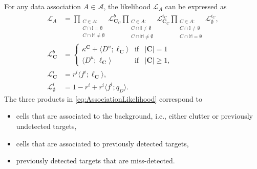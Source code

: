 \documentclass[journal]{IEEEtran}
\begin{document}
For any data association $A\in\mathcal{A}$, the likelihood $\mathcal{L}_{A}$ can be expressed as \cite{pmbmextended2}
\begin{subequations}
\begin{align}
	\mathcal{L}_{A} & = \prod_{ \substack{C\in A : \\ C\cap\mathbb{I}=\emptyset \\ C\cap\mathbb{M}\neq\emptyset}} \mathcal{L}^{b}_{\mathbf{C}_C} \prod_{ \substack{C\in A : \\ C\cap\mathbb{I}\neq \emptyset \\ C\cap\mathbb{M} \neq \emptyset }} \mathcal{L}_{\mathbf{C}_C}^{i_C } \prod_{ \substack{C\in A : \\ C \cap \mathbb{I}\neq\emptyset \\ C\cap\mathbb{M} = \emptyset }} \mathcal{L}_{\emptyset}^{i_C},  \label{eq:AssociationLikelihood}  \\
	\mathcal{L}_{\mathbf{C}}^{b} & = \left\{ \begin{array}{lcl} \kappa^{\mathbf{C}} + \langle D_{}^{u};\ell_{\mathbf{C}} \rangle & \text{if} & |\mathbf{C}|=1 \\ \langle{ D_{}^{u} };{ \ell_{\mathbf{C}} }\rangle & \text{if} & |\mathbf{C}| \geq 1, \end{array} \right. \\
	\mathcal{L}_{\mathbf{C}}^{i} & =  r_{}^{i} \langle{f_{}^{i}};{ \ell_{\mathbf{C}}}\rangle, \\
	\mathcal{L}_{\emptyset}^{i} & = 1-r_{}^{i}+r_{}^{i} \langle{ f_{}^{i} };{ q_{D} }\rangle.
\end{align}%
\label{eq:PMBMlikelihood}%
\end{subequations}
The three products in \eqref{eq:AssociationLikelihood} correspond to
\begin{itemize}
	\item cells that are associated to the background, i.e., either clutter or previously undetected targets,
	\item cells that are associated to previously detected targets,%
	\item previously detected targets that are miss-detected.%
\end{itemize}
\end{document}
